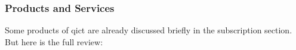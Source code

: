 






\subsubsection{Products and Services}


Some products of \acrshort{qict} are already discussed briefly in the subscription section. But here is the full review:

